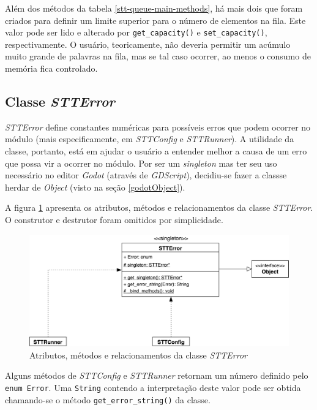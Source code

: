 Além dos métodos da tabela \ref{stt-queue-main-methods}, há mais dois que foram criados para definir um limite superior para o número de elementos na fila. Este valor pode ser lido e alterado por \texttt{get\_capacity()} e \texttt{set\_capacity()}, respectivamente. O usuário, teoricamente, não deveria permitir um acúmulo muito grande de palavras na fila, mas se tal caso ocorrer, ao menos o consumo de memória fica controlado.


\subsection{Classe \textit{STTError}}

\textit{STTError} define constantes numéricas para possíveis erros que podem ocorrer no módulo (mais especificamente, em \textit{STTConfig} e \textit{STTRunner}). A utilidade da classe, portanto, está em ajudar o usuário a entender melhor a causa de um erro que possa vir a ocorrer no módulo. Por ser um \textit{singleton} mas ter seu uso necessário no editor \textit{Godot} (através de \mbox{\textit{GDScript}}), decidiu-se fazer a classse herdar de \textit{Object} (visto na seção \ref{godotObject}).

A figura \ref{stt-error-diagram} apresenta os atributos, métodos e relacionamentos da classe \textit{STTError}. O construtor e destrutor foram omitidos por simplicidade.

\begin{figure}[H]
  \centering
  \includegraphics[width=.9\textwidth]{image/stt-error.pdf}
  \caption{Atributos, métodos e relacionamentos da classe \textit{STTError}}
  \label{stt-error-diagram}
\end{figure}

Alguns métodos de \textit{STTConfig} e \textit{STTRunner} retornam um número definido pelo \texttt{enum Error}. Uma \texttt{String} contendo a interpretação deste valor pode ser obtida chamando-se o método \texttt{get\_error\_string()} da classe.

